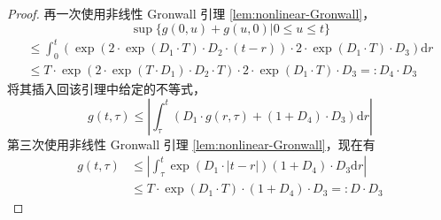 \begin{proof}
再一次使用非线性 Gronwall 引理 \ref{lem:nonlinear-Gronwall}，
\[
\sup \{g(0, u)+g(u, 0) | 0 \leqslant u \leqslant t\}
\]
\[
\begin{array}{l}
\leqslant \int_{0}^{t}\left(\exp \left(2 \cdot \exp \left(D_{1} \cdot T\right) \cdot D_{2} \cdot(t-r)\right) \cdot 2 \cdot \exp \left(D_{1} \cdot T\right) \cdot D_{3}\right) \mathrm{d} r \\
\leqslant T \cdot \exp \left(2 \cdot \exp \left(T \cdot D_{1}\right) \cdot D_{2} \cdot T\right) \cdot 2 \cdot \exp \left(D_{1} \cdot T\right) \cdot D_{3}=: D_{4} \cdot D_{3}
\end{array}
\]
将其插入回该引理中给定的不等式，
\[
g(t, \tau) \leqslant\left|\int_{\tau}^{t}\left(D_{1} \cdot g(r, \tau)+\left(1+D_{4}\right) \cdot D_{3}\right) \mathrm{d} r\right|
\]
第三次使用非线性 Gronwall 引理 \ref{lem:nonlinear-Gronwall}，现在有 
\[
\begin{aligned}
g(t, \tau) & \leqslant\left|\int_{\tau}^{t} \exp \left(D_{1} \cdot|t-r|\right)\left(1+D_{4}\right) \cdot D_{3} \mathrm{d} r\right| \\
& \leqslant T \cdot \exp \left(D_{1} \cdot T\right) \cdot\left(1+D_{4}\right) \cdot D_{3}=: D \cdot D_{3}
\end{aligned}
\]
\end{proof}







